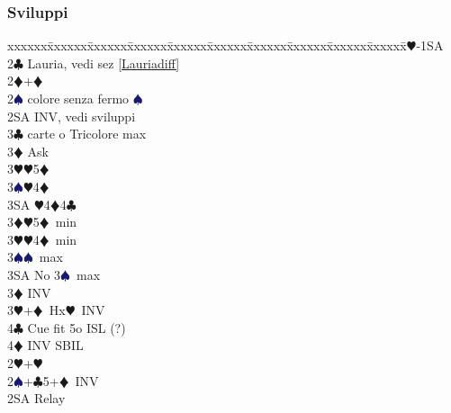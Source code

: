 \documentclass[a4paper,italian]{article}
\newcommand{\BC}{\textcolor{OliveGreen}{$\clubsuit$}}
\newcommand{\BD}{\textcolor{RedOrange}{$\vardiamondsuit$}}
\newcommand{\BH}{\textcolor{Red2}{$\varheartsuit${}}}
\newcommand{\BS}{\textcolor{MidnightBlue}{$\spadesuit${}}}
\newenvironment{bidtable}
{\begin{tabbing}

    xxxxxx\=xxxxxx\=xxxxxx\=xxxxxx\=xxxxxx\=xxxxxx\=xxxxxx\=xxxxxx\=xxxxxx\=xxxxxx\=\kill}
{\end{tabbing} }%
\begin{document}
\begin{multicols*}{2}
                                        \subsubsection{Sviluppi}
                                        \begin{bidtable}
                                            1\BH-1SA\\
                                            2\BC\> Lauria, vedi sez \ref{Lauriadiff}\\
                                            2\BD {}+\BD \+\\
                                            2\BS {} colore senza fermo \BS \\
                                            2SA \> INV, vedi sviluppi\+\\
                                            3\BC {} carte o Tricolore max\+\\
                                            3\BD \> Ask\+\\
                                            3\BH {}\BH 5\BD \\
                                            3\BS {}\BH 4\BD \\
                                            3SA \BH 4\BD 4\BC \-\-\\
                                            3\BD {}\BH 5\BD\ min\\
                                            3\BH {}\BH 4\BD\ min\\
                                            3\BS {}\BS\ max\\
                                            3SA \> No 3\BS\ max\-\\
                                            3\BD \> INV\\
                                            3\BH {}+\BD\ Hx\BH\ INV\\
                                            4\BC \> Cue fit 5o ISL (?)\\
                                            4\BD \> INV SBIL\-\\
                                            2\BH {}+\BH \+\\
                                            2\BS {}+\BC 5+\BD\ INV\+\\
                                            2SA \> Relay\+\\

\end{bidtable}
\end{multicols*}
\end{document}
